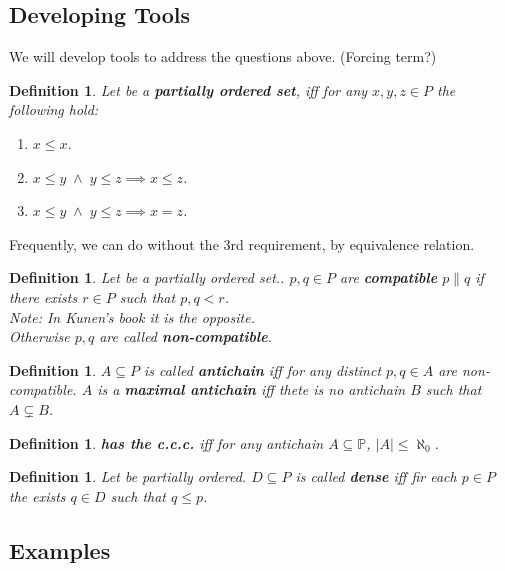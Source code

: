 \documentclass[11pt,pdftex,twoside,a4paper]{article}
\newcommand{\B}[1]{\textbf{#1}}
\newcommand{\ccc}{c.c.c.}
\newtheorem{ldef}[thm]{Definition}
\begin{document}
\subsection{Developing Tools}

We will develop tools to address the questions above.
(Forcing term?)

\begin{ldef}
Let  be a \B{partially ordered set},
iff for any \(x,y,z\in P\) the following hold:
\begin{enumerate}
\item \(x\leq x\).
\item \(x\leq y \; \land\; y\leq z \implies x \leq z\).
\item \(x \leq y\; \land\; y \leq z \implies x = z\).
\end{enumerate}
\end{ldef}
Frequently, we can do without the 3rd requirement, by equivalence relation.

\begin{ldef}
Let  be a {partially ordered set}..
\(p,q \in P\) are \B{compatible} \(p \| q\) if there exists \(r\in P\)
such that \(p,q < r\).\\
\emph{Note}: \textnormal{In Kunen's book it is the opposite.}\\
Otherwise \(p,q\) are called \B{non-compatible}.
\end{ldef}

\begin{ldef}
\(A\subseteq P\) is called \B{antichain} iff for any
 distinct \(p,q\in A\) are non-compatible.
$A$ is a \B{maximal antichain} iff thete is no antichain $B$
such that \(A \subsetneq B\).
\end{ldef}

\begin{ldef}
 \B{has the \ccc} iff 
for any antichain \(A \subseteq \mathbb{P}\), 
\(|A|\leq \aleph_0\).
\end{ldef}

\begin{ldef}
Let  be partially ordered.
\(D\subseteq P\) is called \B{dense} iff fir each \(p\in P\)
the exists \(q\in D\) such that \(q\leq p\).
\end{ldef}

\subsection{Examples}
\end{document}

